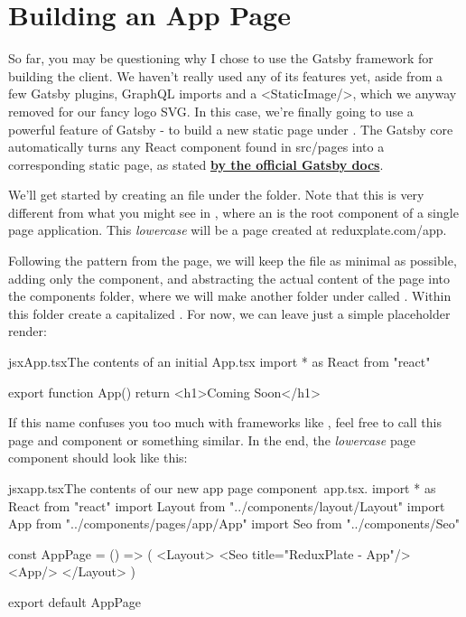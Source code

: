 \documentclass[paper=6in:9in,pagesize=pdftex,headinclude=on,footinclude=on,12pt]{scrbook}
\newcommand{\link}[2]{\textbf{\textcolor{monokaiPink}{\href{#2}{#1}}}}
\begin{document}
\section{Building an App Page}

So far, you may be questioning why I chose to use the Gatsby framework for building the client. We haven't really used any of its features yet, aside from a few Gatsby plugins, GraphQL imports and a <StaticImage/>, which we anyway removed for our fancy logo SVG. In this case, we're finally going to use a powerful feature of Gatsby - to build a new static page under . The Gatsby core automatically turns any React component found in src/pages into a corresponding static page, as stated \link{by the official Gatsby docs}{https://www.gatsbyjs.com/docs/recipes/pages-layouts/}.


We'll get started by creating an  file under the  folder. Note that this is very different from what you might see in , where an  is the root component of a single page application. This \textit{lowercase}  will be a page created at reduxplate.com/app.

Following the pattern from the  page, we will keep the  file as minimal as possible, adding only the  component, and abstracting the actual content of the page into the components folder, where we will make another folder under  called . Within this folder create a capitalized . For now, we can leave just a simple placeholder render:

\begin{codeInput}{jsx}{App.tsx}{The contents of an initial App.tsx}
import * as React from "react"

export function App() {
  return <h1>Coming Soon</h1>
} 
\end{codeInput}

If this name  confuses you too much with frameworks like , feel free to call this page and component  or something similar. In the end, the \textit{lowercase} page component  should look like this:

\begin{codeInput}{jsx}{app.tsx}{The contents of our new app page component\, app.tsx.}
import * as React from "react"
import Layout from "../components/layout/Layout"
import { App } from "../components/pages/app/App"
import Seo from "../components/Seo"

const AppPage = () => (
  <Layout>
    <Seo title="ReduxPlate - App"/>
    <App/>
  </Layout>
)

export default AppPage  
\end{codeInput}
\end{document}
